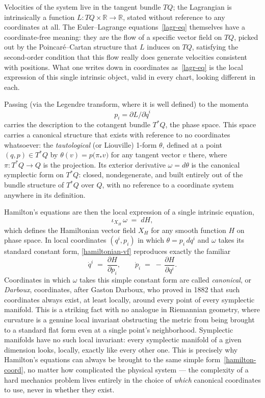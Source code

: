 Velocities of the system live in the tangent bundle $TQ$; the Lagrangian is
intrinsically a function $L : TQ\times\mathbb R \to \mathbb R$, stated without
reference to any coordinates at all. The Euler--Lagrange
equations~\eqref{lagr-eq} themselves have a coordinate-free meaning: they are
the flow of a specific vector field on $TQ$, picked out by the
Poincar\'e--Cartan structure that $L$ induces on $TQ$, satisfying the
second-order condition that this flow really does generate velocities
consistent with positions. What one writes down in coordinates
as~\eqref{lagr-eq} is the local expression of this single intrinsic object,
valid in every chart, looking different in each.

Passing (via the Legendre transform, where it is well defined) to
the momenta 
\begin{equation}
   \label {gen-mom}
   p_i = \partial L/\partial \dot q^i
\end{equation}
carries the
description to the cotangent bundle $T^*Q$, the phase space. This
space carries a canonical structure that exists with reference to no
coordinates whatsoever: the \emph{tautological} (or Liouville) 1-form
$\theta$, defined at a point $(q,p)\in T^*Q$ by $\theta(v) =
p\bigl(\pi_*v\bigr)$ for any tangent vector $v$ there, where $\pi:
T^*Q\to Q$ is the projection. Its exterior derivative $\omega =
d\theta$ is the canonical symplectic form on $T^*Q$: closed,
nondegenerate, and built entirely out of the bundle structure of
$T^*Q$ over $Q$, with no reference to a coordinate system anywhere in
its definition.

Hamilton's equations are then the local expression of a single
intrinsic equation,
\begin{equation}
  \iota_{X_H}\,\omega \;=\; dH,
  \label{hamiltonian-vf}
\end{equation}
which defines the Hamiltonian vector field $X_H$ for any smooth
function $H$ on phase space. In local coordinates $(q^i,p_i)$ in
which $\theta = p_i\,dq^i$ and $\omega$ takes its standard constant
form, \eqref{hamiltonian-vf} reproduces exactly the familiar
\begin{equation}
  \dot q^i \;=\; \frac{\partial H}{\partial p_i},
  \qquad
  \dot p_i \;=\; -\,\frac{\partial H}{\partial q^i}.
  \label{hamilton-coord}
\end{equation}
Coordinates in which $\omega$ takes this simple constant form are
called \emph{canonical}, or \emph{Darboux}, coordinates, after Gaston
Darboux, who proved in 1882 that such coordinates always exist, at
least locally, around every point of every symplectic
manifold. This is a striking fact with no analogue
in Riemannian geometry, where curvature is a genuine local invariant
obstructing the metric from being brought to a standard flat form
even at a single point's neighborhood. Symplectic manifolds have no
such local invariant: every symplectic manifold of a given dimension
looks, locally, exactly like every other one. This is precisely why
Hamilton's equations can always be brought to the same simple
form~\eqref{hamilton-coord}, no matter how complicated the
physical system --- the complexity of a hard mechanics problem lives
entirely in the choice of \emph{which} canonical coordinates to use,
never in whether they exist.


